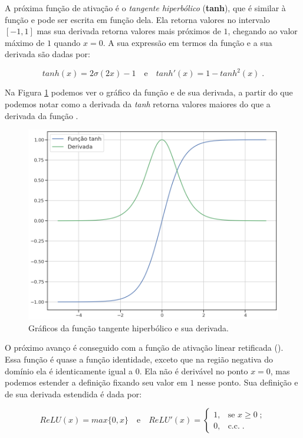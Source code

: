 A próxima função de ativação é o \emph{tangente hiperbólico} (\textbf{tanh}), que é similar à função  e pode ser escrita em função dela. Ela retorna valores no intervalo $[-1, 1]$ mas sua derivada retorna valores mais próximos de $1$, chegando ao valor máximo de $1$ quando $x = 0$. A sua expressão em termos da função  e a sua derivada são dadas por:

\[ tanh(x)=2\sigma(2x) - 1   \quad \text{e} \quad  tanh'(x)=1 - tanh^2(x) \;. \]

Na Figura \ref{fig:tanh} podemos ver o gráfico da função e de sua derivada, a partir do que podemos notar como a derivada da \emph{tanh} retorna valores maiores do que a derivada da função .

\begin{figure}[htb]
\centering
\includegraphics[width=12cm]{figuras/tanh}
\caption{Gráficos da função tangente hiperbólico e sua derivada.}
\label{fig:tanh}
\end{figure}

O próximo avanço é conseguido com a função de ativação linear retificada (). Essa função é quase a função identidade, exceto que na região negativa do domínio ela é identicamente igual a $0$. Ela não é derivável no ponto $x=0$, mas podemos estender a definição fixando seu valor em $1$ nesse ponto. Sua definição e de sua derivada estendida é dada por:

\[
ReLU(x)=max\{0, x\}   \quad \text{e} \quad  ReLU'(x)=
	\begin{cases}
    	1, & \text{se } x\ge 0 \;;\\
    	0, & \text{c.c.} \;.
	\end{cases}
\]

